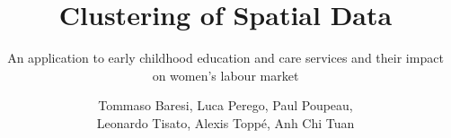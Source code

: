 \documentclass[12pt,aspectratio=169]{beamer}
\title{Clustering of Spatial Data}
\subtitle{An application to early childhood education and care
services and their impact on women’s labour market}
\author{
  Tommaso Baresi, 
  Luca Perego, 
  Paul Poupeau, \\
  Leonardo Tisato,
  Alexis Toppé,
  Anh Chi Tuan}
\institute{28\textsuperscript{\tiny{th}} of November 2025 }
\begin{document}
\aurigatitleframe








\end{document}
